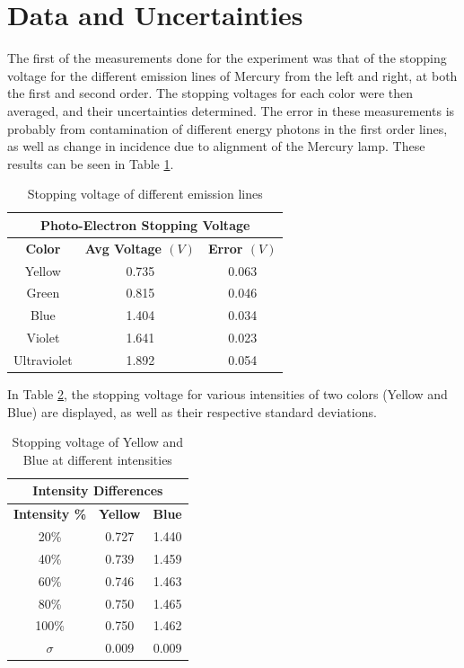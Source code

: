 \documentclass[a4paper, twocolumn]{article}
\begin{document}
\section{Data and Uncertainties}
The first of the measurements done for the experiment was that of the stopping voltage for the different emission lines of Mercury from the left and
right, at both the first and second order. The stopping voltages for each color were then averaged, and their uncertainties determined. The error
in these measurements is probably from contamination of different energy photons in the first order lines, as well as change in incidence due to
alignment of the Mercury lamp. These results can be seen in Table \ref{table:stopvolt}.
\begin{table}[h!]
 \centering
 \begin{tabular}{|c|c|c|}
  \hline
  \multicolumn{3}{|c|}{\textbf{Photo-Electron Stopping Voltage}} \\
  \hline
  \textbf{Color} & \textbf{Avg Voltage $(V)$} & \textbf{Error $(V)$} \\
  \hline
  Yellow & 0.735 & 0.063 \\
  \hline
  Green & 0.815 & 0.046 \\
  \hline
  Blue & 1.404 & 0.034 \\
  \hline
  Violet & 1.641 & 0.023 \\
  \hline
  Ultraviolet & 1.892 & 0.054 \\
  \hline
 \end{tabular}
 \caption{Stopping voltage of different emission lines}
 \label{table:stopvolt}
\end{table}
\vfill\eject
In Table \ref{table:intdiff}, the stopping voltage for various intensities of two colors (Yellow and Blue) are displayed, as well as their respective
standard deviations.
\begin{table}[h!]
 \centering
 \begin{tabular}{|c|c|c|}
  \hline
  \multicolumn{3}{|c|}{\textbf{Intensity Differences}} \\
  \hline
  \textbf{Intensity \%} & \textbf{Yellow} & \textbf{Blue} \\
  \hline
  20\% & 0.727 & 1.440 \\
  \hline
  40\% & 0.739 & 1.459 \\
  \hline
  60\% & 0.746 & 1.463 \\
  \hline
  80\% & 0.750 & 1.465 \\
  \hline
  100\% & 0.750 & 1.462 \\
  \hline
  \hline
  \textbf{$\sigma$} & 0.009 & 0.009 \\
  \hline
 \end{tabular}
 \caption{Stopping voltage of Yellow and Blue at different intensities}
 \label{table:intdiff}
\end{table}
\end{document}
